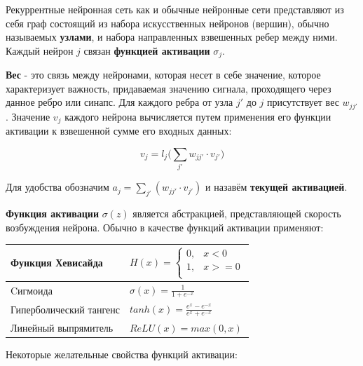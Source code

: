 \documentclass[a4paper,russian]{article}
\begin{document}
	Рекуррентные нейронная сеть как и обычные нейронные сети представляют из себя граф состоящий из набора искусственных нейронов (вершин), обычно называемых \textbf{узлами}, и набора направленных взвешенных ребер между ними. Каждый нейрон $j$ связан \textbf{функцией активации} $\sigma_j$.
	
	\textbf{Вес} - это связь между нейронами, которая несет в себе значение, которое характеризует важность, придаваемая значению сигнала, проходящего через данное ребро или синапс. Для каждого ребра от узла $j'$ до $j$ присутствует вес $w_{jj'}$. Значение $v_j$ каждого нейрона вычисляется путем применения его функции активации к взвешенной сумме его входных данных: 
	
	$$v_j = l_j\bigg(\sum_{j'} w_{jj'} \cdot v_{j'}\bigg)$$
	
	Для удобства обозначим $a_j = \sum_{j'} (w_{jj'} \cdot v_{j'})$ и назавём \textbf{текущей активацией}. 
	
	\textbf{Функция активации} $\sigma(z)$ является абстракцией, представляющей скорость возбуждения нейрона. Обычно в качестве функций активации применяют:
	
	\begin{table}[h]
		\centering
		\begin{tabular}{|l|l|} 
			\hline
			Функция Хевисайда       &   
			$ H(x) = 
			\begin{cases}
				0, & x < 0 \\
				1, & x >= 0 \\
			\end{cases}$ \\ 
			\hline
			Cигмоида                &  $\sigma(x) = \frac{1}{1 + e^{-x}}$ \\ 
			\hline
			Гиперболический тангенс &  $tanh(x) = \frac{e^x - e^{-x}}{e^x + e^{-x}}$ \\ 
			\hline
			Линейный выпрямитель    &  $ReLU(x) = max(0, x)$ \\
			\hline
		\end{tabular}
	\end{table}

	\clearpage
	
	Некоторые желательные свойства функций активации:
	
\end{document}

